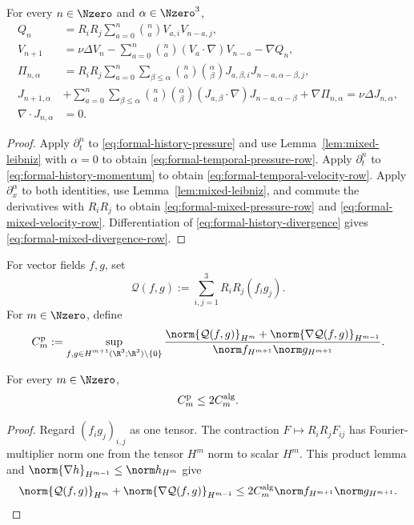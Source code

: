 \begin{proposition}
\label{prop:formal-mixed-recurrences}
For every \(n\in\Nzero\) and \(\alpha\in\Nzero^3\),
\begin{align}
 Q_n
 &=R_iR_j
 \sum_{a=0}^{n}\binom na V_{a,i}V_{n-a,j},
 \label{eq:formal-temporal-pressure-row}\\
 V_{n+1}
 &=
 \nu\Delta V_n
 -\sum_{a=0}^{n}\binom na(V_a\cdot\nabla)V_{n-a}
 -\nabla Q_n,
 \label{eq:formal-temporal-velocity-row}\\
 \Pi_{n,\alpha}
 &=R_iR_j
 \sum_{a=0}^{n}\sum_{\beta\le\alpha}
 \binom na\binom{\alpha}{\beta}
 J_{a,\beta,i}J_{n-a,\alpha-\beta,j},
 \label{eq:formal-mixed-pressure-row}\\
 J_{n+1,\alpha}
 &+
 \sum_{a=0}^{n}\sum_{\beta\le\alpha}
 \binom na\binom{\alpha}{\beta}
 (J_{a,\beta}\cdot\nabla)
 J_{n-a,\alpha-\beta}
 +\nabla\Pi_{n,\alpha}
 =\nu\Delta J_{n,\alpha},
 \label{eq:formal-mixed-velocity-row}\\
 \nabla\cdot J_{n,\alpha}&=0.
 \label{eq:formal-mixed-divergence-row}
\end{align}
\end{proposition}

\begin{proof}
Apply \(\partial_t^n\) to \eqref{eq:formal-history-pressure} and use
Lemma~\ref{lem:mixed-leibniz} with \(\alpha=0\) to obtain
\eqref{eq:formal-temporal-pressure-row}.  Apply \(\partial_t^n\) to
\eqref{eq:formal-history-momentum} to obtain
\eqref{eq:formal-temporal-velocity-row}.  Apply
\(\partial_x^\alpha\) to both identities, use
Lemma~\ref{lem:mixed-leibniz}, and commute the derivatives with \(R_iR_j\)
to obtain \eqref{eq:formal-mixed-pressure-row} and
\eqref{eq:formal-mixed-velocity-row}.  Differentiation of
\eqref{eq:formal-history-divergence} gives
\eqref{eq:formal-mixed-divergence-row}.
\end{proof}

\begin{definition}
\label{def:formal-canonical-bilinear-constants}
For vector fields \(f,g\), set
\[
 \mathcal Q(f,g):=\sum_{i,j=1}^3R_iR_j(f_i g_j).
\]
For \(m\in\Nzero\), define
\[
 C_m^{\rm p}:=
 \sup_{\substack{
 f,g\in H^{m+1}(\R^3;\R^3)\setminus\{0\}}}
 \frac{
 \norm{\mathcal Q(f,g)}_{H^m}
 +\norm{\nabla\mathcal Q(f,g)}_{H^{m-1}}}
 {\norm f_{H^{m+1}}\norm g_{H^{m+1}}}.
\]
\end{definition}

\begin{lemma}
\label{lem:formal-canonical-bilinear-constants}
For every \(m\in\Nzero\),
\[
 C_m^{\rm p}\le2C_m^{\rm alg}.
\]
\end{lemma}
\begin{proof}
Regard \((f_i g_j)_{i,j}\) as one tensor.  The contraction
\(F\mapsto R_iR_jF_{ij}\) has Fourier-multiplier norm one from the tensor
\(H^m\) norm to scalar \(H^m\).  This product lemma and
\(\norm{\nabla h}_{H^{m-1}}\le\norm h_{H^m}\) give
\[
 \norm{\mathcal Q(f,g)}_{H^m}
 +\norm{\nabla\mathcal Q(f,g)}_{H^{m-1}}
 \le2C_m^{\rm alg}\norm f_{H^{m+1}}\norm g_{H^{m+1}}.
\]
\end{proof}

